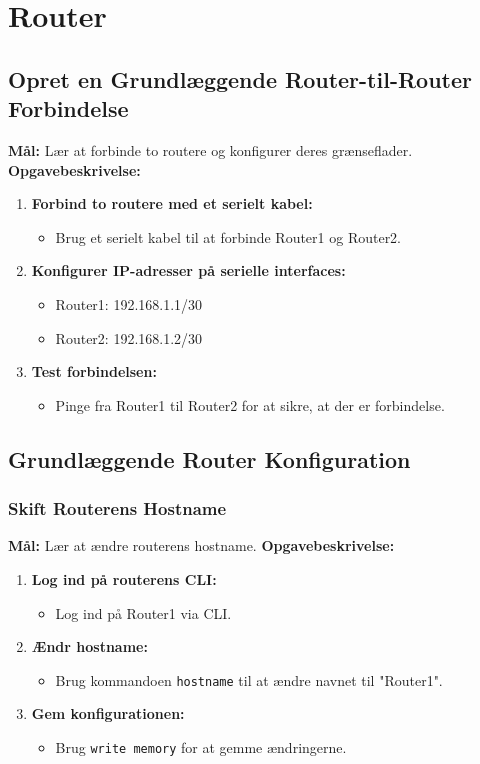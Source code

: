 \section{Router}
\subsection{Opret en Grundlæggende Router-til-Router Forbindelse}
\textbf{Mål:} Lær at forbinde to routere og konfigurer deres grænseflader.
\newline\newline\noindent
\textbf{Opgavebeskrivelse:}
\begin{enumerate}
	\item \textbf{Forbind to routere med et serielt kabel:}
	\begin{itemize}
		\item Brug et serielt kabel til at forbinde Router1 og Router2.
	\end{itemize}
	\item \textbf{Konfigurer IP-adresser på serielle interfaces:}
	\begin{itemize}
		\item Router1: 192.168.1.1/30
		\item Router2: 192.168.1.2/30
	\end{itemize}
	\item \textbf{Test forbindelsen:}
	\begin{itemize}
		\item Pinge fra Router1 til Router2 for at sikre, at der er forbindelse.
	\end{itemize}
\end{enumerate}

\subsection{Grundlæggende Router Konfiguration}
\subsubsection*{Skift Routerens Hostname}
\textbf{Mål:} Lær at ændre routerens hostname.
\newline\newline\noindent
\textbf{Opgavebeskrivelse:}
\begin{enumerate}
	\item \textbf{Log ind på routerens CLI:}
	\begin{itemize}
		\item Log ind på Router1 via CLI.
	\end{itemize}
	\item \textbf{Ændr hostname:}
	\begin{itemize}
		\item Brug kommandoen \texttt{hostname} til at ændre navnet til "Router1".
	\end{itemize}
	\item \textbf{Gem konfigurationen:}
	\begin{itemize}
		\item Brug \texttt{write memory} for at gemme ændringerne.
	\end{itemize}
\end{enumerate}

